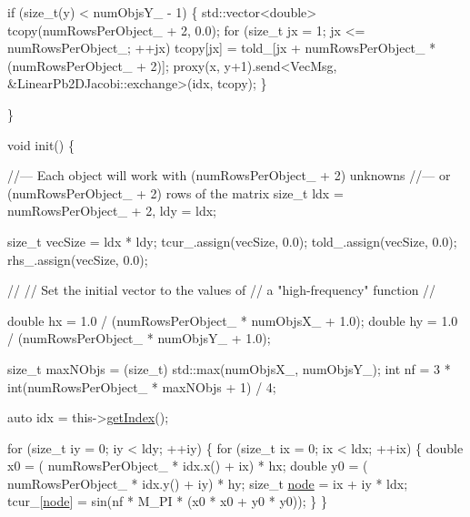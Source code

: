 \begin{DoxyCodeInclude}
    \textcolor{keywordflow}{if} (\textcolor{keywordtype}{size\_t}(y) < numObjsY\_ - 1) \{
      std::vector<double> tcopy(numRowsPerObject\_ + 2, 0.0);
      \textcolor{keywordflow}{for} (\textcolor{keywordtype}{size\_t} jx = 1; jx <= numRowsPerObject\_; ++jx)
        tcopy[jx] = told\_[jx + numRowsPerObject\_ * (numRowsPerObject\_ + 2)];
      proxy(x, y+1).send<VecMsg, &LinearPb2DJacobi::exchange>(idx, tcopy);
    \}

  \}


  \textcolor{keywordtype}{void} init() \{

    \textcolor{comment}{//--- Each object will work with (numRowsPerObject\_ + 2) unknowns}
    \textcolor{comment}{//--- or (numRowsPerObject\_ + 2) rows of the matrix}
    \textcolor{keywordtype}{size\_t} ldx = numRowsPerObject\_ + 2, ldy = ldx;

    \textcolor{keywordtype}{size\_t} vecSize = ldx * ldy;
    tcur\_.assign(vecSize, 0.0);
    told\_.assign(vecSize, 0.0);
    rhs\_.assign(vecSize, 0.0);

    \textcolor{comment}{//}
    \textcolor{comment}{// Set the initial vector to the values of}
    \textcolor{comment}{// a "high-frequency" function}
    \textcolor{comment}{//}

    \textcolor{keywordtype}{double} hx = 1.0 / (numRowsPerObject\_ * numObjsX\_ + 1.0);
    \textcolor{keywordtype}{double} hy = 1.0 / (numRowsPerObject\_ * numObjsY\_ + 1.0);

    \textcolor{keywordtype}{size\_t} maxNObjs = (size\_t) std::max(numObjsX\_, numObjsY\_);
    \textcolor{keywordtype}{int} nf = 3 * int(numRowsPerObject\_ * maxNObjs + 1) / 4;

    \textcolor{keyword}{auto} idx = this->\hyperlink{namespacecheckpoint_1_1dispatch_1_1typeregistry_aa75ef84e9b63a687784360ded2d56fe4}{getIndex}();

    \textcolor{keywordflow}{for} (\textcolor{keywordtype}{size\_t} iy = 0; iy < ldy; ++iy) \{
      \textcolor{keywordflow}{for} (\textcolor{keywordtype}{size\_t} ix = 0; ix < ldx; ++ix) \{
        \textcolor{keywordtype}{double} x0 = ( numRowsPerObject\_ * idx.x() + ix) * hx;
        \textcolor{keywordtype}{double} y0 = ( numRowsPerObject\_ * idx.y() + iy) * hy;
        \textcolor{keywordtype}{size\_t} \hyperlink{namespacevt_1_1config_a46e57c33bee1b9f1fa95455af86d80e0a576033c81e2ddd03d721ecef3b1b3f81}{node} = ix + iy * ldx;
        tcur\_[\hyperlink{namespacevt_1_1config_a46e57c33bee1b9f1fa95455af86d80e0a576033c81e2ddd03d721ecef3b1b3f81}{node}] = sin(nf * M\_PI * (x0 * x0 + y0 * y0));
      \}
    \}


\end{DoxyCodeInclude}
